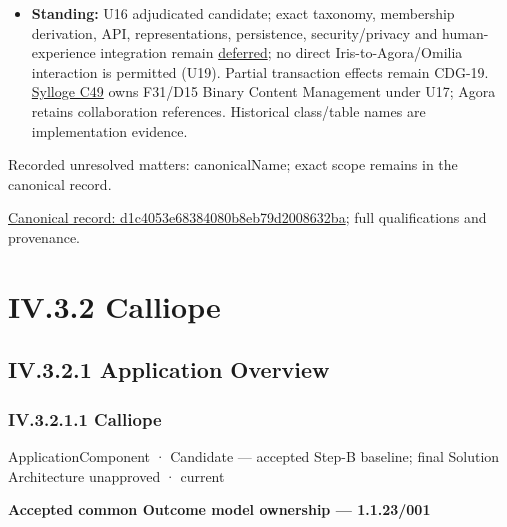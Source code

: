 \begin{itemize}
\item \textbf{Standing:} U16 adjudicated candidate; exact taxonomy, membership derivation,
  API, representations, persistence, security/privacy and human-experience
  integration remain \hyperref[element:d1c4053e68384080b8eb79d2008632ba]{deferred};
  no direct Iris-to-Agora/Omilia interaction is permitted (U19).
  Partial transaction effects remain CDG-19. \hyperref[element:feea742463b84021b66853d287d8916f]{Sylloge C49} owns F31/D15
  Binary Content Management under U17; Agora retains collaboration references.
  Historical class/table names are implementation evidence.

\end{itemize}

{\small Recorded unresolved matters: canonicalName; exact scope remains in the canonical record.}\par
{\footnotesize \href{../../../../../../../continuum/application/application-component/d1c4053e68384080b8eb79d2008632ba.md}{Canonical record: d1c4053e68384080b8eb79d2008632ba}; full qualifications and provenance.}\par
\section*{IV.3.2 Calliope}
\label{navigation:IV.3.2}

\subsection*{IV.3.2.1 Application Overview}
\label{navigation:IV.3.2.1}

\subsubsection*{IV.3.2.1.1 Calliope}
\label{navigation:IV.3.2.1.1}

\label{element:466ad8f75a954c0581b5bba090443849}
{\small ApplicationComponent · Candidate — accepted Step-B baseline; final Solution Architecture unapproved · current}\par

\par\medskip\textbf{Accepted common Outcome model ownership — 1.1.23/001}\par


